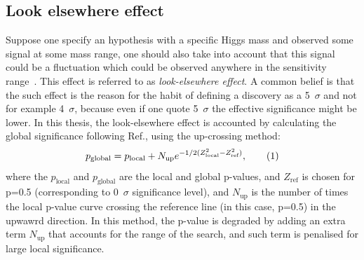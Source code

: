 \subsection{Look elsewhere effect}
\label{sec:stats:look-elsewhere}
Suppose one specify an hypothesis with a specific Higgs mass and observed some signal at some mass range, 
one should also take into account that this signal could be a fluctuation which could be observed anywhere in
the sensitivity range~\cite{look-elsewhere}. This effect is referred to as \textit{look-elsewhere effect}.
A common belief is that the such effect is the reason for the
habit of defining a discovery as a 5~$\sigma$ and not for example 4~$\sigma$, 
because even if one quote 5~$\sigma$ the effective significance might be lower.
In this thesis, the look-elsewhere effect is accounted by calculating the global significance
following Ref.\cite{global-significance}, using the up-crossing method:
\[ p_\text{global} = p_\text{local} +  N_\text{up} e^{-1/2(Z^2_\text{local} - Z^2_\text{ref})},
\addtag \]
where the $p_\text{local}$ and $p_\text{global}$ are the local and global p-values, and
$Z_\text{ref}$ is chosen for p=0.5 (corresponding to 0~$\sigma$ significance level), 
and $N_\text{up}$ is the number of times the local p-value curve crossing the reference line (in this case,
p=0.5) in the upwawrd direction.
In this method, the p-value is degraded by adding an extra term $N_\text{up}$
that accounts for the range of the search, and such term is penalised for large local significance. 
